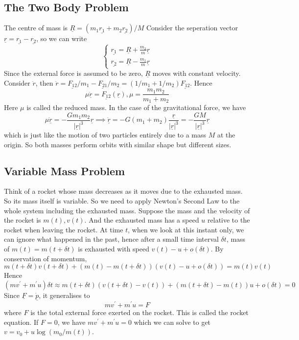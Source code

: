 \subsection{The Two Body Problem}
The centre of mass is $\underline{R}=(m_1\underline{r_1}+m_2\underline{r_2})/M$
Consider the seperation vector $\underline{r}=\underline{r_1}-\underline{r_2}$, so we can write
$$\begin{cases}
    \underline{r_1}=\underline{R}+\frac{m_2}{m}\underline{r}\\
    \underline{r_2}=\underline{R}-\frac{m_1}{m}\underline{r}
\end{cases}$$
Since the external force is assumed to be zero, $\underline{R}$ moves with constant velocity.
Consider $\ddot{r}$, then $\ddot{r}=\underline{F_{12}}/m_1-\underline{F_{21}}/m_2=(1/m_1+1/m_2)\underline{F_{12}}$.
Hence
$$\mu\underline{\ddot{r}}=\underline{F_{12}}(\underline{r}),\mu=\frac{m_1m_2}{m_1+m_2}$$
Here $\mu$ is called the reduced mass.
In the case of the gravitational force, we have
$$\mu\underline{\ddot{r}}=-\frac{Gm_1m_2}{|\underline{r}|^3}\underline{r}\implies\underline{\ddot{r}}=-G(m_1+m_2)\frac{\underline{r}}{|\underline{r}|^3}=-\frac{GM}{|\underline{r}|^3}\underline{r}$$
which is just like the motion of two particles entirely due to a mass $M$ at the origin.
So both masses perform orbits with similar shape but different sizes.
\subsection{Variable Mass Problem}
Think of a rocket whose mass decreases as it moves due to the exhausted mass.
So its mass itself is variable.
So we need to apply Newton's Second Law to the whole system including the exhausted mass.
Suppose the mass and the velocity of the rocket is $m(t),v(t)$.
And the exhausted mass has a speed $u$ relative to the rocket when leaving the rocket.
At time $t$, when we look at this instant only, we can ignore what happened in the past, hence after a small time interval $\delta t$, mass of $m(t)=m(t+\delta t)$ is exhausted with speed $v(t)-u+o(\delta t)$.
By conservation of momentum,
$$m(t+\delta t)v(t+\delta t)+(m(t)-m(t+\delta t))(v(t)-u+o(\delta t))=m(t)v(t)$$
Hence
$$(mv^\prime+m^\prime u)\delta t\approx m(t+\delta t)(v(t+\delta t)-v(t))+(m(t+\delta t)-m(t))u+o(\delta t)=0$$
Since $\underline{F}=\underline{\dot{p}}$, it generalises to
$$mv^\prime+m^\prime u=F$$
where $F$ is the total external force exerted on the rocket.
This is called the rocket equation.
If $F=0$, we have $mv^\prime+m^\prime u=0$ which we can solve to get $v=v_0+u\log(m_0/m(t))$.
